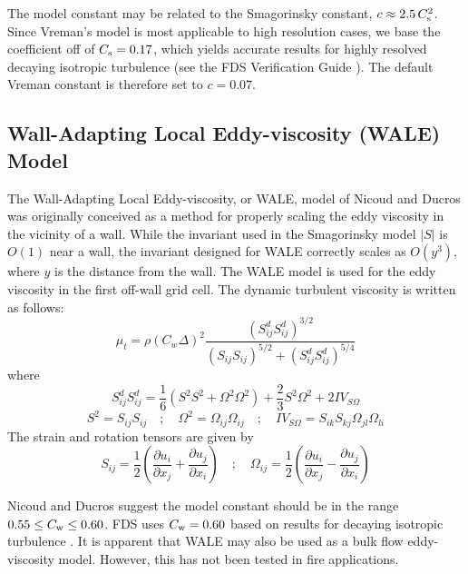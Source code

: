 The model constant may be related to the Smagorinsky constant, $c \approx 2.5 \, C_{\rm s}^2$.  Since Vreman's model is most applicable to high resolution cases, we base the coefficient off of $C_{\rm s} = 0.17$, which yields accurate results for highly resolved decaying isotropic turbulence (see the FDS Verification Guide \cite{FDS_Verification_Guide}).  The default Vreman constant is therefore set to $c = 0.07$.

\subsection{Wall-Adapting Local Eddy-viscosity (WALE) Model}
\label{sec:wale}

The Wall-Adapting Local Eddy-viscosity, or WALE, model of Nicoud and Ducros \cite{Nicoud:1999} was originally conceived as a method for properly scaling the eddy viscosity in the vicinity of a wall.  While the invariant used in the Smagorinsky model $|S|$ is $O(1)$ near a wall, the invariant designed for WALE correctly scales as $O(y^3)$, where $y$ is the distance from the wall.  The WALE model is used for the eddy viscosity in the first off-wall grid cell.  The dynamic turbulent viscosity is written as follows:
\begin{equation}
\label{eq:wale}
\mu_{\si{t}} = \rho (C_{\si{w}} \Delta)^2 \frac{(S^d_{ij} S^d_{ij})^{3/2}}{(S_{ij} S_{ij})^{5/2} + (S^d_{ij} S^d_{ij})^{5/4}}
\end{equation}
where
\begin{equation}
S^d_{ij} S^d_{ij} = \frac{1}{6} \left(S^2 S^2 + \Omega^2 \Omega^2\right) + \frac{2}{3} S^2 \Omega^2 + 2 {IV}_{S\Omega}
\end{equation}
\begin{equation*}
S^2 = S_{ij} S_{ij} \quad ; \quad \Omega^2 = \Omega_{ij} \Omega_{ij} \quad ; \quad {IV}_{S\Omega} = S_{ik}S_{kj}\Omega_{jl}\Omega_{li}
\end{equation*}
The strain and rotation tensors are given by
\begin{equation}
S_{ij} = \frac{1}{2} \left( \frac{\partial u_i}{\partial x_j} + \frac{\partial u_j}{\partial x_i} \right) \quad ; \quad \Omega_{ij} = \frac{1}{2} \left( \frac{\partial u_i}{\partial x_j} - \frac{\partial u_j}{\partial x_i} \right)
\end{equation}

Nicoud and Ducros \cite{Nicoud:1999} suggest the model constant should be in the range $0.55 \le C_{\rm w} \le 0.60$.  FDS uses $C_{\rm w} = 0.60$ based on results for decaying isotropic turbulence \cite{FDS_Verification_Guide}.  It is apparent that WALE may also be used as a bulk flow eddy-viscosity model.  However, this has not been tested in fire applications.

